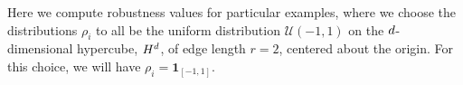 

Here we compute robustness values for particular examples, where we choose the distributions $\rho_i$ to all be the uniform distribution $\mathcal{U}(-1,1)$ on the $d$-dimensional hypercube, $H^d$, of edge length $r=2$, centered about the origin.  For this choice, we will have $\rho_i = \mathbf{1}_{[-1,1]}$.  

